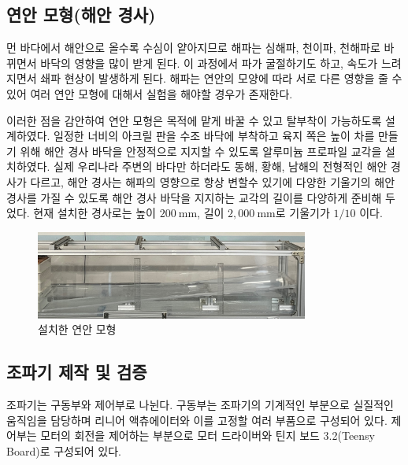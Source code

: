 \subsection{연안 모형(해안 경사)}

먼 바다에서 해안으로 올수록 수심이 얕아지므로 해파는 심해파, 천이파, 천해파로 바뀌면서 바닥의 영향을 많이 받게 된다. 이 과정에서 파가 굴절하기도 하고, 속도가 느려지면서 쇄파 현상이 발생하게 된다. 해파는 연안의 모양에 따라 서로 다른 영향을 줄 수 있어 여러 연안 모형에 대해서 실험을 해야할 경우가 존재한다.

이러한 점을 감안하여 연안 모형은 목적에 맡게 바꿀 수 있고 탈부착이 가능하도록 설계하였다. 일정한 너비의 아크릴 판을 수조 바닥에 부착하고 육지 쪽은 높이 차를 만들기 위해 해안 경사 바닥을 안정적으로 지지할 수 있도록 알루미늄 프로파일 교각을 설치하였다. 실제 우리나라 주변의 바다만 하더라도 동해, 황해, 남해의 전형적인 해안 경사가 다르고, 해안 경사는 해파의 영향으로 항상 변할수 있기에 다양한 기울기의 해안 경사를 가질 수 있도록 해안 경사 바닥을 지지하는 교각의 길이를 다양하게 준비해 두었다. 현재 설치한 경사로는 높이 $200\mathrm{~mm}$, 길이 $2,000\mathrm{~mm}$로 기울기가 $1/10$ 이다. 

\begin{figure}[htbp]
	\begin{center}
		\includegraphics[width=0.8\textwidth]{images/slope.jpg}
		\caption{설치한 연안 모형}
		\label{Slope}
	\end{center}
\end{figure}

\subsection{조파기 제작 및 검증}



조파기는 구동부와 제어부로 나뉜다. 구동부는 조파기의 기계적인 부분으로 실질적인 움직임을 담당하며 리니어 액츄에이터와 이를 고정할 여러 부품으로 구성되어 있다. 제어부는 모터의 회전을 제어하는 부분으로 모터 드라이버와 틴지 보드 3.2(Teensy Board)로 구성되어 있다.

